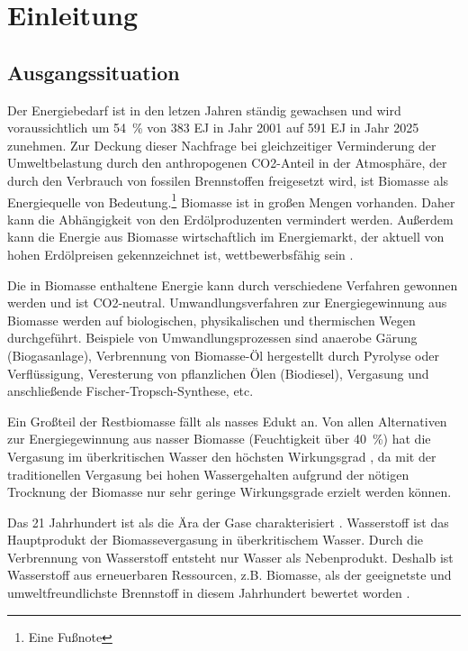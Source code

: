 \chapter{Einleitung}
\section{Ausgangssituation}
Der Energiebedarf ist in den letzen Jahren ständig gewachsen und wird voraussichtlich um 54~\% von 383 EJ in Jahr 2001 auf 591 EJ in Jahr 2025 zunehmen. Zur Deckung dieser Nachfrage bei gleichzeitiger Verminderung der Umweltbelastung durch den anthropogenen  CO2-Anteil in der Atmosphäre, der durch den Verbrauch von fossilen Brennstoffen freigesetzt wird, ist Biomasse als Energiequelle von Bedeutung.\footnote{Eine Fußnote}
Biomasse ist in großen Mengen vorhanden. Daher kann die Abhängigkeit von den Erdölproduzenten vermindert werden. Außerdem kann die Energie aus Biomasse wirtschaftlich im Energiemarkt, der aktuell von hohen Erdölpreisen gekennzeichnet ist, wettbewerbsfähig sein .

Die in Biomasse enthaltene Energie kann durch verschiedene Verfahren gewonnen werden und ist CO2-neutral. Umwandlungsverfahren zur Energiegewinnung aus Biomasse werden auf biologischen, physikalischen und thermischen Wegen durchgeführt. Beispiele von Umwandlungsprozessen sind anaerobe Gärung (Biogasanlage), Verbrennung von Biomasse-Öl hergestellt durch Pyrolyse oder Verflüssigung, Veresterung von pflanzlichen Ölen (Biodiesel), Vergasung und anschließende  Fischer-Tropsch-Synthese, etc.

Ein Großteil der Restbiomasse fällt als nasses Edukt an. Von allen Alternativen zur Energiegewinnung aus nasser Biomasse (Feuchtigkeit über  40~\%) hat die Vergasung im überkritischen Wasser den höchsten Wirkungsgrad \cite{Yoshi03}, da mit der traditionellen Vergasung bei hohen Wassergehalten aufgrund der nötigen Trocknung der Biomasse nur sehr geringe Wirkungsgrade erzielt werden können. 

Das 21 Jahrhundert ist als die Ära der Gase charakterisiert \cite{Hef02}. Wasserstoff ist das Hauptprodukt der Biomassevergasung in überkritischem Wasser. Durch die Verbrennung von Wasserstoff entsteht nur Wasser als Nebenprodukt. Deshalb ist Wasserstoff aus erneuerbaren Ressourcen, z.B. Biomasse, als der geeignetste und  umweltfreundlichste  Brennstoff in diesem Jahrhundert bewertet worden \cite{Bern03}.

